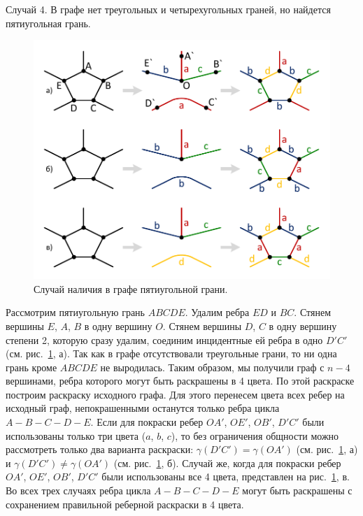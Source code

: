 Случай 4. В графе нет треугольных и четырехугольных граней, но найдется пятиугольная грань.

\begin{figure}[ht]
\centering
\includegraphics[width=1.0\textwidth]{./pics/text_3_graph_prim/coloring4_face5.pdf}
\singlespacing
{}\caption{Случай наличия в графе пятиугольной грани.}
\label{fig:text_3_graph_prim_coloring4_face5}
\end{figure}

Рассмотрим пятиугольную грань $ABCDE$.
Удалим ребра $ED$ и $BC$.
Стянем вершины $E$, $A$, $B$ в одну вершину $O$.
Стянем вершины $D$, $C$ в одну вершину степени 2, которую сразу удалим, соединим инцидентные ей ребра в одно $D'C'$ (см. рис.~\ref{fig:text_3_graph_prim_coloring4_face5}, а).
Так как в графе отсутствовали треугольные грани, то ни одна грань кроме $ABCDE$ не выродилась.
Таким образом, мы получили граф с $n - 4$ вершинами, ребра которого могут быть раскрашены в 4 цвета.
По этой раскраске построим раскраску исходного графа.
Для этого перенесем цвета всех ребер на исходный граф, непокрашенными останутся только ребра цикла $A-B-C-D-E$.
Если для покраски ребер $OA'$, $OE'$, $OB'$, $D'C'$ были использованы только три цвета ($a$, $b$, $c$), то без ограничения общности можно рассмотреть только два варианта раскраски: $\gamma(D'C') = \gamma(OA')$ (см. рис.~\ref{fig:text_3_graph_prim_coloring4_face5}, а) и $\gamma(D'C') \ne \gamma(OA')$ (см. рис.~\ref{fig:text_3_graph_prim_coloring4_face5}, б). 
Случай же, когда для покраски ребер $OA'$, $OE'$, $OB'$, $D'C'$ были использованы все 4 цвета, представлен на рис.~\ref{fig:text_3_graph_prim_coloring4_face5}, в.
Во всех трех случаях ребра цикла $A-B-C-D-E$ могут быть раскрашены с сохранением правильной реберной раскраски в 4 цвета.

